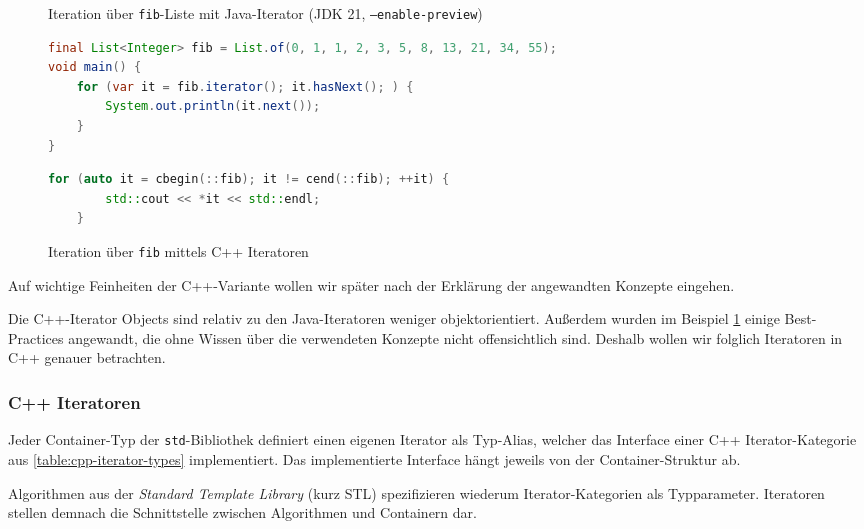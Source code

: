 \documentclass[runningheads]{llncs}
\begin{document}
\begin{figure}
	\vspace{-1em}
	\caption{Iteration über \texttt{fib}-Liste mit Java-Iterator (JDK 21, \texttt{--enable-preview})}
	\label{code:iterator-java}
	\begin{lstlisting}[language=Java]
final List<Integer> fib = List.of(0, 1, 1, 2, 3, 5, 8, 13, 21, 34, 55);
void main() {
    for (var it = fib.iterator(); it.hasNext(); ) {
        System.out.println(it.next());
    }
}\end{lstlisting}
	\caption{Iteration über \texttt{fib} mittels C++ Iteratoren}
	\label{code:iterator-cpp}
	\begin{lstlisting}[language=C++]
	for (auto it = cbegin(::fib); it != cend(::fib); ++it) {
		std::cout << *it << std::endl;
	}\end{lstlisting}
	\vspace{-1.5em}
\end{figure}

\noindent Auf wichtige Feinheiten der C++-Variante wollen wir später nach der Erklärung der angewandten Konzepte eingehen.

Die C++-Iterator Objects sind relativ zu den Java-Iteratoren weniger objektorientiert.
Außerdem wurden im Beispiel \ref{code:iterator-cpp} einige Best-Practices angewandt, die ohne Wissen über die verwendeten Konzepte nicht offensichtlich sind.
Deshalb wollen wir folglich Iteratoren in C++ genauer betrachten.

\subsubsection{C++ Iteratoren}

Jeder Container-Typ der \texttt{std}-Bibliothek definiert einen eigenen Iterator als Typ-Alias, welcher das Interface einer C++ Iterator-Kategorie aus \autoref{table:cpp-iterator-types} implementiert.
Das implementierte Interface hängt jeweils von der Container-Struktur ab.

Algorithmen aus der \textit{Standard Template Library} (kurz STL) spezifizieren wiederum Iterator-Kategorien als Typparameter.
Iteratoren stellen demnach die Schnittstelle zwischen Algorithmen und Containern dar.
\end{document}
